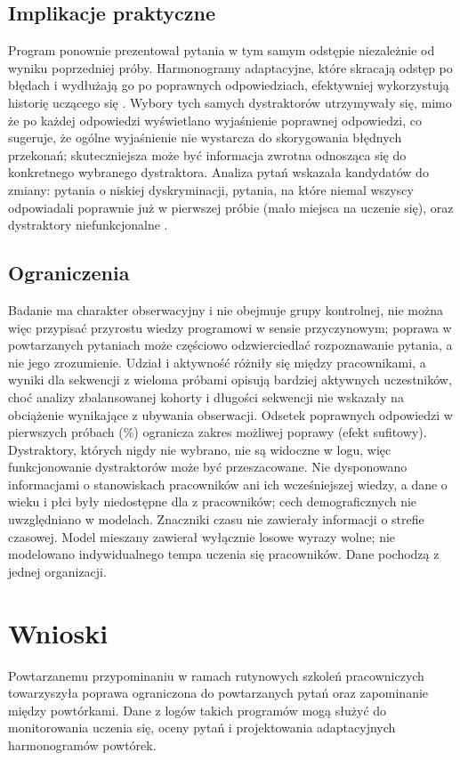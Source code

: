 \subsection{Implikacje praktyczne}
Program ponownie prezentował pytania w tym samym odstępie niezależnie od wyniku poprzedniej próby.
Harmonogramy adaptacyjne, które skracają odstęp po błędach i wydłużają go po poprawnych odpowiedziach,
efektywniej wykorzystują historię uczącego się \citep{lindsey2014,settles2016,tabibian2019}. Wybory
tych samych dystraktorów utrzymywały się, mimo że po każdej odpowiedzi wyświetlano wyjaśnienie poprawnej odpowiedzi,
co sugeruje, że ogólne wyjaśnienie nie wystarcza do skorygowania błędnych przekonań; skuteczniejsza może
być informacja zwrotna odnosząca się do konkretnego wybranego dystraktora. Analiza pytań wskazała
kandydatów do zmiany: pytania o niskiej dyskryminacji, pytania, na które niemal wszyscy odpowiadali
poprawnie już w pierwszej próbie (mało miejsca na uczenie się), oraz dystraktory niefunkcjonalne
\citep{tarrant2009,gierl2017}.

\subsection{Ograniczenia}
Badanie ma charakter obserwacyjny i nie obejmuje grupy kontrolnej, nie można więc przypisać przyrostu
wiedzy programowi w sensie przyczynowym; poprawa w powtarzanych pytaniach może częściowo odzwierciedlać
rozpoznawanie pytania, a nie jego zrozumienie. Udział i aktywność różniły się między pracownikami,
a wyniki dla sekwencji z wieloma próbami opisują bardziej aktywnych uczestników, choć analizy
zbalansowanej kohorty i długości sekwencji nie wskazały na obciążenie wynikające z ubywania obserwacji.
Odsetek poprawnych odpowiedzi w pierwszych próbach (\AccFirst\%) ogranicza zakres możliwej poprawy
(efekt sufitowy).
Dystraktory, których nigdy nie wybrano, nie są widoczne w logu, więc funkcjonowanie dystraktorów może
być przeszacowane. Nie dysponowano informacjami o stanowiskach pracowników ani ich wcześniejszej wiedzy,
a dane o wieku i płci były niedostępne dla \DemoUnmatched{} z \DemoN{} pracowników; cech
demograficznych nie uwzględniano w modelach. Znaczniki czasu nie zawierały informacji o strefie
czasowej. Model mieszany zawierał wyłącznie losowe wyrazy wolne; nie modelowano indywidualnego tempa uczenia się pracowników.
Dane pochodzą z jednej organizacji.

\section{Wnioski}
Powtarzanemu przypominaniu w ramach rutynowych szkoleń pracowniczych towarzyszyła poprawa ograniczona
do powtarzanych pytań oraz zapominanie między powtórkami. Dane z logów takich programów
mogą służyć do monitorowania uczenia się, oceny pytań i projektowania adaptacyjnych harmonogramów
powtórek.
